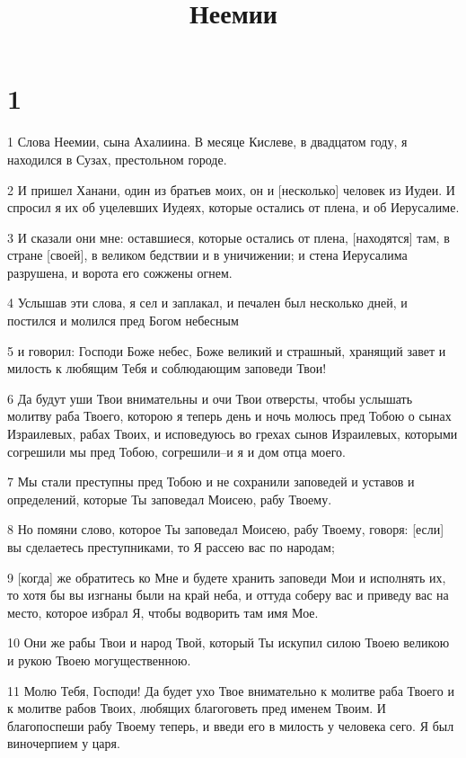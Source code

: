 

\title{Неемии}


\chapter{1}

\par 1 Слова Неемии, сына Ахалиина. В месяце Кислеве, в двадцатом году, я находился в Сузах, престольном городе.
\par 2 И пришел Ханани, один из братьев моих, он и [несколько] человек из Иудеи. И спросил я их об уцелевших Иудеях, которые остались от плена, и об Иерусалиме.
\par 3 И сказали они мне: оставшиеся, которые остались от плена, [находятся] там, в стране [своей], в великом бедствии и в уничижении; и стена Иерусалима разрушена, и ворота его сожжены огнем.
\par 4 Услышав эти слова, я сел и заплакал, и печален был несколько дней, и постился и молился пред Богом небесным
\par 5 и говорил: Господи Боже небес, Боже великий и страшный, хранящий завет и милость к любящим Тебя и соблюдающим заповеди Твои!
\par 6 Да будут уши Твои внимательны и очи Твои отверсты, чтобы услышать молитву раба Твоего, которою я теперь день и ночь молюсь пред Тобою о сынах Израилевых, рабах Твоих, и исповедуюсь во грехах сынов Израилевых, которыми согрешили мы пред Тобою, согрешили--и я и дом отца моего.
\par 7 Мы стали преступны пред Тобою и не сохранили заповедей и уставов и определений, которые Ты заповедал Моисею, рабу Твоему.
\par 8 Но помяни слово, которое Ты заповедал Моисею, рабу Твоему, говоря: [если] вы сделаетесь преступниками, то Я рассею вас по народам;
\par 9 [когда] же обратитесь ко Мне и будете хранить заповеди Мои и исполнять их, то хотя бы вы изгнаны были на край неба, и оттуда соберу вас и приведу вас на место, которое избрал Я, чтобы водворить там имя Мое.
\par 10 Они же рабы Твои и народ Твой, который Ты искупил силою Твоею великою и рукою Твоею могущественною.
\par 11 Молю Тебя, Господи! Да будет ухо Твое внимательно к молитве раба Твоего и к молитве рабов Твоих, любящих благоговеть пред именем Твоим. И благопоспеши рабу Твоему теперь, и введи его в милость у человека сего. Я был виночерпием у царя.

